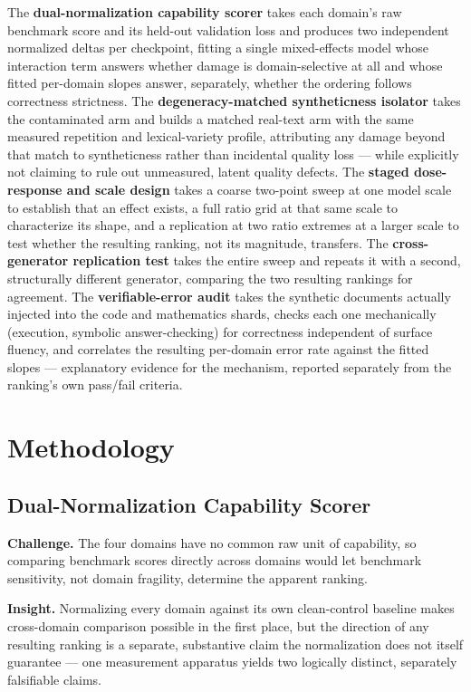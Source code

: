 \documentclass[11pt]{article}
\begin{document}
The \textbf{dual-normalization capability scorer} takes each domain's raw benchmark score and its held-out validation loss and produces two independent normalized deltas per checkpoint, fitting a single mixed-effects model whose interaction term answers whether damage is domain-selective at all and whose fitted per-domain slopes answer, separately, whether the ordering follows correctness strictness. The \textbf{degeneracy-matched syntheticness isolator} takes the contaminated arm and builds a matched real-text arm with the same measured repetition and lexical-variety profile, attributing any damage beyond that match to syntheticness rather than incidental quality loss --- while explicitly not claiming to rule out unmeasured, latent quality defects. The \textbf{staged dose-response and scale design} takes a coarse two-point sweep at one model scale to establish that an effect exists, a full ratio grid at that same scale to characterize its shape, and a replication at two ratio extremes at a larger scale to test whether the resulting ranking, not its magnitude, transfers. The \textbf{cross-generator replication test} takes the entire sweep and repeats it with a second, structurally different generator, comparing the two resulting rankings for agreement. The \textbf{verifiable-error audit} takes the synthetic documents actually injected into the code and mathematics shards, checks each one mechanically (execution, symbolic answer-checking) for correctness independent of surface fluency, and correlates the resulting per-domain error rate against the fitted slopes --- explanatory evidence for the mechanism, reported separately from the ranking's own pass/fail criteria.

\section{Methodology}

\subsection{Dual-Normalization Capability Scorer}
\textbf{Challenge.} The four domains have no common raw unit of capability, so comparing benchmark scores directly across domains would let benchmark sensitivity, not domain fragility, determine the apparent ranking.

\textbf{Insight.} Normalizing every domain against its own clean-control baseline makes cross-domain comparison possible in the first place, but the direction of any resulting ranking is a separate, substantive claim the normalization does not itself guarantee --- one measurement apparatus yields two logically distinct, separately falsifiable claims.
\end{document}
